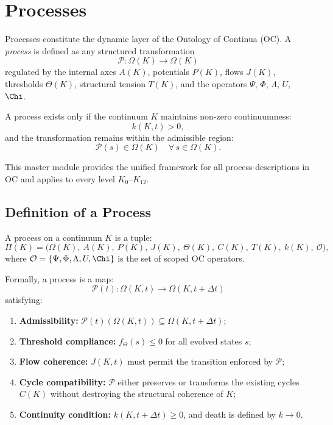 

\section{Processes}
\label{sec:processes-master}

Processes constitute the dynamic layer of the Ontology of Continua (OC).  
A \emph{process} is defined as any structured transformation
\[
\mathcal{P}: \Omega(K) \longrightarrow \Omega(K)
\]
regulated by the internal axes $A(K)$, potentials $P(K)$, flows $J(K)$,
thresholds $\Theta(K)$, structural tension $T(K)$, and the operators 
$\Psi$, $\Phi$, $\Lambda$, $U$, $\Chi$.

A process exists only if the continuum $K$ maintains
non-zero continuumness:
\[
k(K,t) > 0,
\]
and the transformation remains within the admissible region:
\[
\mathcal{P}(s) \in \Omega(K) \quad \forall\, s \in \Omega(K).
\]

This master module provides the unified framework for all
process-descriptions in OC and applies to every level $K_0$--$K_{12}$.

\subsection{Definition of a Process}

A process on a continuum $K$ is a tuple:
\[
\Pi(K) = 
\bigl(
\Omega(K),\ 
A(K),\ 
P(K),\ 
J(K),\ 
\Theta(K),\ 
C(K),\ 
T(K),\ 
k(K),\ 
\mathcal{O}
\bigr),
\]
where $\mathcal{O} = \{\Psi, \Phi, \Lambda, U, \Chi\}$ is the set of
scoped OC operators.

Formally, a process is a map:
\[
\mathcal{P}(t): \Omega(K,t) \to \Omega(K,t+\Delta t)
\]
satisfying:

\begin{enumerate}
    \item \textbf{Admissibility:} 
    $\mathcal{P}(t)(\Omega(K,t)) \subseteq \Omega(K,t+\Delta t)$;

    \item \textbf{Threshold compliance:}
    $f_{\Theta}(s) \le 0$ for all evolved states $s$;

    \item \textbf{Flow coherence:}
    $J(K,t)$ must permit the transition enforced by $\mathcal{P}$;

    \item \textbf{Cycle compatibility:}
    $\mathcal{P}$ either preserves or transforms the existing cycles $C(K)$
    without destroying the structural coherence of $K$;

    \item \textbf{Continuity condition:}
    $k(K,t+\Delta t) \ge 0$, and death is defined by $k \to 0$.
\end{enumerate}

